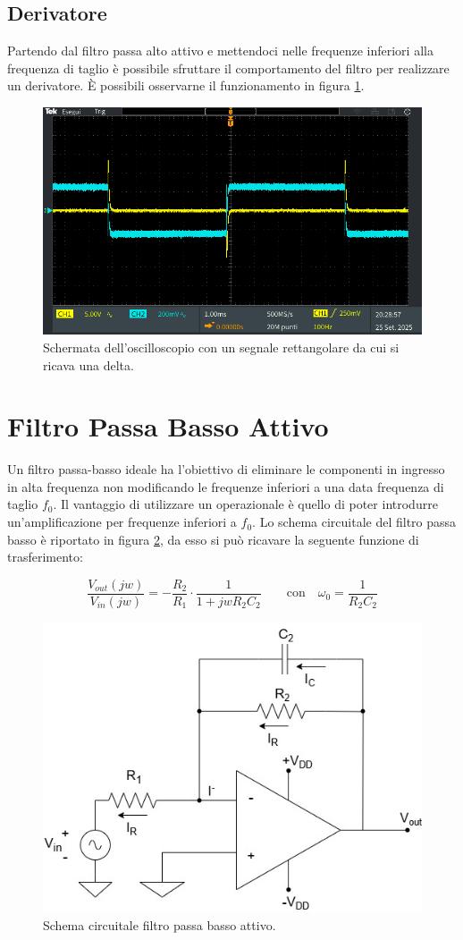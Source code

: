 \documentclass[a4paper,12pt]{article}
\begin{document}
\subsection*{Derivatore}
Partendo dal filtro passa alto attivo e mettendoci nelle frequenze inferiori alla frequenza di taglio è possibile sfruttare il comportamento del filtro per realizzare un derivatore. È possibili osservarne il funzionamento in figura \ref{fig:derivatore_oscilloscopio}.

\begin{figure}[h]
    \centering
    \includegraphics[width = 0.7\linewidth]{immagini/plot_oscilloscopio/TEK00059.PNG}
    \caption{Schermata dell'oscilloscopio con un segnale rettangolare da cui si ricava una delta.}
    \label{fig:derivatore_oscilloscopio}
\end{figure}

\clearpage
\pagebreak

\section*{Filtro Passa Basso Attivo} 
Un filtro passa-basso ideale ha l'obiettivo di eliminare le componenti in ingresso in alta frequenza non modificando le frequenze inferiori a una data frequenza di taglio $f_0$. Il vantaggio di utilizzare un operazionale è quello di poter introdurre un'amplificazione per frequenze inferiori a $f_0$. Lo schema circuitale del filtro passa basso è riportato in figura \ref{fig:filtroPassaBasso}, da esso si può ricavare la seguente funzione di trasferimento:

 $$\dfrac{V_{out}(jw)}{V_{in}(jw)}=-\dfrac{R_{2}}{R_{1}}\cdot\dfrac{1}{1+jwR_{2}C_{2}}  \qquad  \text{con} \quad \omega_{0}=\dfrac{1}{R_{2}C_{2}}$$

\begin{figure}[h]
    \centering
    \includegraphics[width = 0.5\linewidth]{immagini/filtro_passa_basso.png}
    \caption{Schema circuitale filtro passa basso attivo.}
    \label{fig:filtroPassaBasso}
\end{figure}
\end{document}
